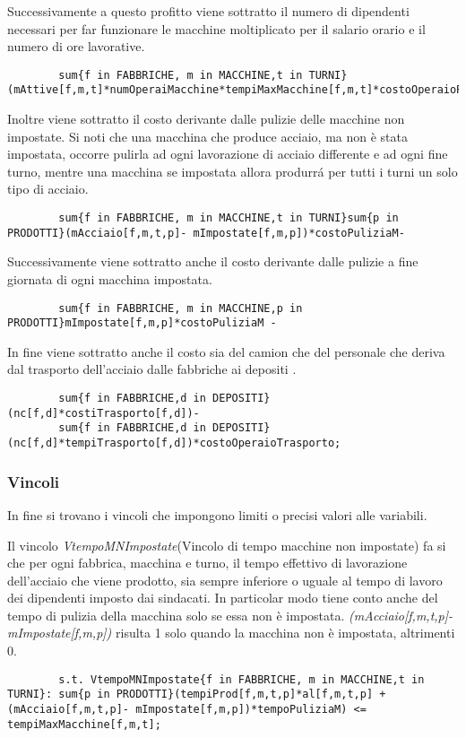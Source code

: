 \documentclass[12pt]{article} %
\begin{document}
		Successivamente a questo profitto viene sottratto il numero di dipendenti necessari per far funzionare le macchine moltiplicato per il salario orario e il numero di ore lavorative.
		\begin{lstlisting}
		sum{f in FABBRICHE, m in MACCHINE,t in TURNI}(mAttive[f,m,t]*numOperaiMacchine*tempiMaxMacchine[f,m,t]*costoOperaioProduzione)-
		\end{lstlisting}

		Inoltre viene sottratto il costo derivante dalle pulizie delle macchine non impostate.
		Si noti che una macchina che produce acciaio, ma non è stata impostata, occorre pulirla ad ogni lavorazione di acciaio differente e ad ogni fine turno, mentre una macchina se impostata allora produrr\'a per tutti i turni un solo tipo di acciaio.
		\begin{lstlisting}
		sum{f in FABBRICHE, m in MACCHINE,t in TURNI}sum{p in PRODOTTI}(mAcciaio[f,m,t,p]- mImpostate[f,m,p])*costoPuliziaM-
		\end{lstlisting}

		Successivamente viene sottratto anche il costo derivante dalle pulizie a fine giornata di ogni macchina impostata.
		\begin{lstlisting}
		sum{f in FABBRICHE, m in MACCHINE,p in PRODOTTI}mImpostate[f,m,p]*costoPuliziaM -
		\end{lstlisting}

		In fine viene sottratto anche il costo sia del camion che del personale che deriva dal trasporto dell'acciaio dalle fabbriche ai depositi .
		\begin{lstlisting}
		sum{f in FABBRICHE,d in DEPOSITI}(nc[f,d]*costiTrasporto[f,d])-
		sum{f in FABBRICHE,d in DEPOSITI}(nc[f,d]*tempiTrasporto[f,d])*costoOperaioTrasporto;
		\end{lstlisting}


	\subsubsection{Vincoli}
		In fine si trovano i vincoli che impongono limiti o precisi valori alle variabili.

		Il vincolo \textit{VtempoMNImpostate}(Vincolo di tempo macchine non impostate) fa si che per ogni fabbrica, macchina e turno, il tempo effettivo di lavorazione dell'acciaio che viene prodotto, sia sempre inferiore o uguale al tempo di lavoro dei dipendenti imposto dai sindacati.
		In particolar modo tiene conto anche del tempo di pulizia della macchina solo se essa non è impostata.
		\textit{(mAcciaio[f,m,t,p]- mImpostate[f,m,p])} risulta 1 solo quando la macchina non è impostata, altrimenti 0.
		\begin{lstlisting}
		s.t. VtempoMNImpostate{f in FABBRICHE, m in MACCHINE,t in TURNI}: sum{p in PRODOTTI}(tempiProd[f,m,t,p]*al[f,m,t,p] + (mAcciaio[f,m,t,p]- mImpostate[f,m,p])*tempoPuliziaM) <= tempiMaxMacchine[f,m,t];
		\end{lstlisting}
\end{document}
